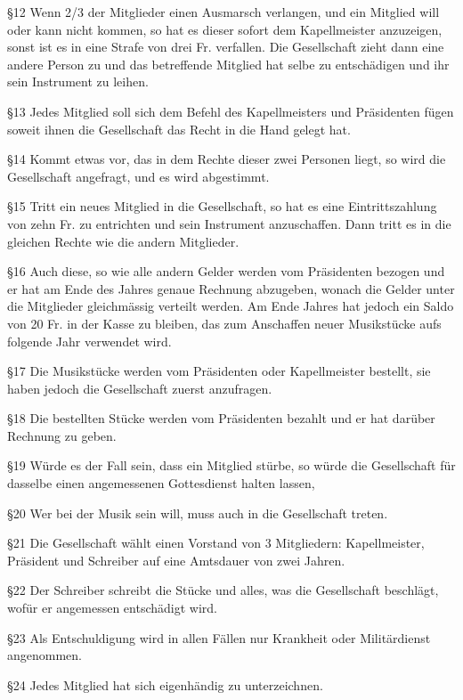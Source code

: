 \begin{multicols}{2}
    \S12 Wenn 2/3 der Mitglieder einen Ausmarsch verlangen, und ein Mitglied
    will oder kann nicht kommen, so hat es dieser sofort dem Kapellmeister
    anzuzeigen, sonst ist es in eine Strafe von drei Fr. verfallen. Die
    Gesellschaft zieht dann eine andere Person zu und das betreffende Mitglied
    hat selbe zu entschädigen und ihr sein Instrument zu leihen.

    \S13 Jedes Mitglied soll sich dem Befehl des Kapellmeisters und Präsidenten
    fügen soweit ihnen die Gesellschaft das Recht in die Hand gelegt hat.

    \S14 Kommt etwas vor, das in dem Rechte dieser zwei Personen liegt, so wird
    die Gesellschaft angefragt, und es wird abgestimmt.

    \S15 Tritt ein neues Mitglied in die Gesellschaft, so hat es eine
    Eintrittszahlung von zehn Fr. zu entrichten und sein Instrument
    anzuschaffen. Dann tritt es in die gleichen Rechte wie die andern
    Mitglieder.

    \S16 Auch diese, so wie alle andern Gelder werden vom Präsidenten bezogen
    und er hat am Ende des Jahres genaue Rechnung abzugeben, wonach die Gelder
    unter die Mitglieder gleichmässig verteilt werden. Am Ende Jahres hat jedoch
    ein Saldo von 20 Fr. in der Kasse zu bleiben, das zum Anschaffen neuer
    Musikstücke aufs folgende Jahr verwendet wird.

    \S17 Die Musikstücke werden vom Präsidenten oder Kapellmeister bestellt, sie
    haben jedoch die Gesellschaft zuerst anzufragen.

    \S18 Die bestellten Stücke werden vom Präsidenten bezahlt und er hat darüber
    Rechnung zu geben.

    \S19 Würde es der Fall sein, dass ein Mitglied stürbe, so würde die
    Gesellschaft für dasselbe einen angemessenen Gottesdienst halten lassen,

    \S20 Wer bei der Musik sein will, muss auch in die Gesellschaft treten.

    \S21 Die Gesellschaft wählt einen Vorstand von 3 Mitgliedern: Kapellmeister,
    Präsident und Schreiber auf eine Amtsdauer von zwei Jahren.

    \S22 Der Schreiber schreibt die Stücke und alles, was die Gesellschaft
    beschlägt, wofür er angemessen entschädigt wird.

    \S23 Als Entschuldigung wird in allen Fällen nur Krankheit oder
    Militärdienst angenommen.

    \S24 Jedes Mitglied hat sich eigenhändig zu unterzeichnen.\\


\end{multicols}
